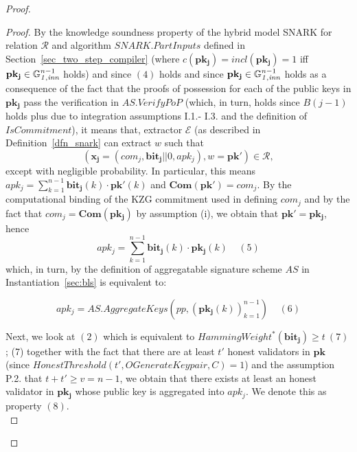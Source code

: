 \begin{proof}
\begin{proof}
\noindent By the knowledge soundness property of the hybrid model SNARK for relation $\mathcal{R}$ and 
algorithm $\mathit{SNARK.PartInputs}$ defined in Section~\ref{sec_two_step_compiler}  
(where $c(\mathbf{pk_j}) = \mathit{incl}(\mathbf{pk_j}) =1$ 
iff $\mathbf{pk_j} \in \mathbb{G}_{\mathit{1,inn}}^{n-1}$ holds) and since $(4)$ holds and since $\mathbf{pk_j} \in \mathbb{G}_{\mathit{1,inn}}^{n-1}$ holds 
as a consequence of the fact that the proofs of possession for each of the public
keys in $\mathbf{pk_j}$ pass the verification in $\mathit{AS.VerifyPoP}$ (which, in turn, holds since 
$B(j-1)$ holds plus due to integration assumptions I.1.- I.3. and the definition of $\mathit{IsCommitment}$), 
it means that, extractor $\mathcal{E}$ (as described in Definition~\ref{dfn_snark} can extract 
$w$ such that $$(\mathbf{x_j} = (\mathit{com_j},\mathbf{bit_j}||0,\mathit{apk_j}), w = \mathbf{pk'}) \in \mathcal{R},$$ 
except with negligible probability. In particular, this means $\mathit{apk_j} = \sum_{k=1}^{n-1} \mathbf{bit_j}(k) \cdot \mathbf{pk'}(k)$ and 
$\mathbf{Com}(\mathbf{pk'}) = \mathit{com_j}$. By the computational binding of the KZG commitment used in defining $\mathit{com_j}$ 
and by the fact that  $\mathit{com_j} = \mathbf{Com}(\mathbf{pk_j})$ by assumption (i), we obtain that $\mathbf{pk'} = \mathbf{pk_j}$, 
hence
$$\mathit{apk_j} = \sum_{k=1}^{n-1} \mathbf{bit_j}(k) \cdot \mathbf{pk_j}(k) \ \ \ \ \ (5)$$ 
which, in turn, by the definition of aggregatable signature scheme $\mathit{AS}$ in Instantiation~\ref{sec:bls} is equivalent to: 

$$\mathit{apk_j} = \mathit{AS.AggregateKeys}(\mathit{pp}, (\mathbf{pk_j}(k))_{k=1}^{n-1}) \ \ \ \ \ (6)$$ 

\noindent Next, we look at $(2)$ which is equivalent to $\mathit{HammingWeight^*}(\mathbf{bit_j}) \geq t \ (7)$; (7)  
together with the fact that there are at least $t'$ honest validators in 
$\mathbf{pk}$ (since $\mathit{HonestThreshold}(t', \mathit{OGenerateKeypair}, C) = 1$) and the assumption P.2. that 
$t+t' \geq v=n-1$, we obtain that there exists at least an honest validator in $\mathbf{pk_j}$ 
whose public key is aggregated into $\mathit{apk_j}$. We denote this as property $(8)$. \\


\end{proof}
\end{proof}
